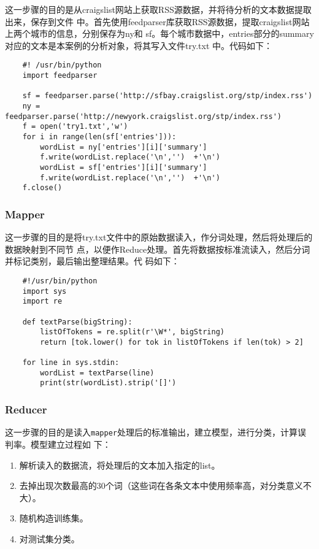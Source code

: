 这一步骤的目的是从craigslist网站上获取RSS源数据，并将待分析的文本数据提取出来，保存到文件
中。首先使用feedparser库获取RSS源数据，提取craigslist网站上两个城市的信息，分别保存为ny和
sf。每个城市数据中，entries部分的summary对应的文本是本案例的分析对象，将其写入文件try.txt
中。代码如下：

\begin{lstlisting}
	#! /usr/bin/python
	import feedparser

	sf = feedparser.parse('http://sfbay.craigslist.org/stp/index.rss')
	ny = feedparser.parse('http://newyork.craigslist.org/stp/index.rss')
	f = open('try1.txt','w')
	for i in range(len(sf['entries'])):
	    wordList = ny['entries'][i]['summary']
	    f.write(wordList.replace('\n','')  +'\n')
	    wordList = sf['entries'][i]['summary']
	    f.write(wordList.replace('\n','')  +'\n')
	f.close()
\end{lstlisting}

\subsubsection{Mapper}\label{mapper}

这一步骤的目的是将try.txt文件中的原始数据读入，作分词处理，然后将处理后的数据映射到不同节
点，以便作Reduce处理。首先将数据按标准流读入，然后分词并标记类别，最后输出整理结果。代
码如下：

\begin{lstlisting}
	#!/usr/bin/python
	import sys
	import re

	def textParse(bigString):
	    listOfTokens = re.split(r'\W*', bigString)
	    return [tok.lower() for tok in listOfTokens if len(tok) > 2]

	for line in sys.stdin:
	    wordList = textParse(line)
	    print(str(wordList).strip('[]')
\end{lstlisting}

\subsubsection{Reducer}\label{reducer}

这一步骤的目的是读入\lstinline|mapper|处理后的标准输出，建立模型，进行分类，计算误判率。模型建立过程如
下：

\begin{enumerate}
\def\labelenumi{\arabic{enumi}.}
\itemsep1pt\parskip0pt
\item
  解析读入的数据流，将处理后的文本加入指定的list。
\item
  去掉出现次数最高的30个词（这些词在各条文本中使用频率高，对分类意义不大）。
\item
  随机构造训练集。
\item
  对测试集分类。
\end{enumerate}

